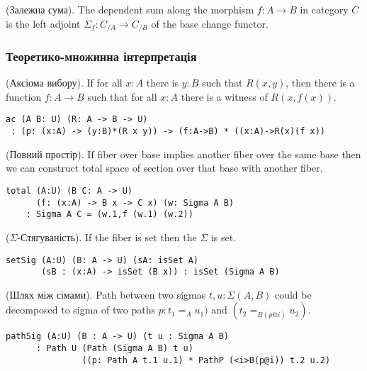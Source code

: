 \begin{definition} (Залежна сума).
The dependent sum along the morphism $f: A \rightarrow B$ in category $C$ is the left
adjoint $\Sigma_f : C_{/A} \rightarrow C_{/B}$ of the base change functor.
\end{definition}

\subsubsection{Теоретико-множинна інтерпретація}

\begin{theorem} (Аксіома вибору).
If for all $x : A$ there is $y : B$ such that $R(x,y)$,
then there is a function $f : A \rightarrow B$
such that for all $x : A$ there is a witness of $R(x,f(x))$.
\begin{lstlisting}
ac (A B: U) (R: A -> B -> U)
 : (p: (x:A) -> (y:B)*(R x y)) -> (f:A->B) * ((x:A)->R(x)(f x))
\end{lstlisting}
\end{theorem}

\begin{theorem} (Повний простір).
If fiber over base implies another fiber
over the same base then we can construct total space of section
over that base with another fiber.
\begin{lstlisting}
total (A:U) (B C: A -> U)
      (f: (x:A) -> B x -> C x) (w: Sigma A B)
    : Sigma A C = (w.1,f (w.1) (w.2))
\end{lstlisting}
\end{theorem}

\begin{theorem} ($\Sigma$-Стягуваність). If the fiber is set then the $\Sigma$ is set.
\begin{lstlisting}
setSig (A:U) (B: A -> U) (sA: isSet A)
       (sB : (x:A) -> isSet (B x)) : isSet (Sigma A B)
\end{lstlisting}
\end{theorem}

\begin{theorem} (Шлях між сімами).
Path between two sigmas $t,u: \Sigma(A,B)$ could be decomposed to
sigma of two paths $p:t_1=_{A}u_1)$ and $(t_2=_{B(p@i)}u_2)$.
\begin{lstlisting}
pathSig (A:U) (B : A -> U) (t u : Sigma A B)
      : Path U (Path (Sigma A B) t u)
               ((p: Path A t.1 u.1) * PathP (<i>B(p@i)) t.2 u.2)
\end{lstlisting}
\end{theorem}

